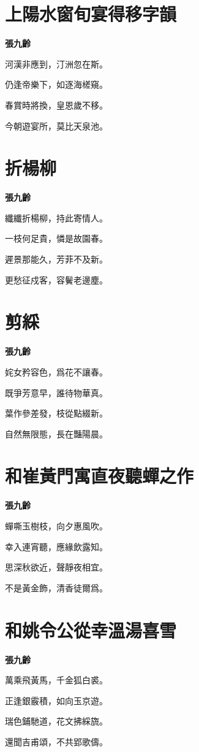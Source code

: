 \documentclass[12pt,a4paper]{ctexbook}
\begin{document}
\section{上陽水窗旬宴得移字韻}
\textbf{張九齡}\par\vspace{0.5em}
河漢非應到，汀洲忽在斯。\par
仍逢帝樂下，如逐海槎窺。\par
春賞時將換，皇恩歲不移。\par
今朝遊宴所，莫比天泉池。\par

\section{折楊柳}
\textbf{張九齡}\par\vspace{0.5em}
纖纖折楊柳，持此寄情人。\par
一枝何足貴，憐是故園春。\par
遲景那能久，芳菲不及新。\par
更愁征戍客，容鬢老邊塵。\par

\section{剪綵}
\textbf{張九齡}\par\vspace{0.5em}
姹女矜容色，爲花不讓春。\par
既爭芳意早，誰待物華真。\par
葉作參差發，枝從點綴新。\par
自然無限態，長在豔陽晨。\par

\section{和崔黃門寓直夜聽蟬之作}
\textbf{張九齡}\par\vspace{0.5em}
蟬嘶玉樹枝，向夕惠風吹。\par
幸入連宵聽，應緣飲露知。\par
思深秋欲近，聲靜夜相宜。\par
不是黃金飾，清香徒爾爲。\par

\section{和姚令公從幸溫湯喜雪}
\textbf{張九齡}\par\vspace{0.5em}
萬乘飛黃馬，千金狐白裘。\par
正逢銀霰積，如向玉京遊。\par
瑞色鋪馳道，花文拂綵旒。\par
還聞吉甫頌，不共郢歌儔。\par
\end{document}
